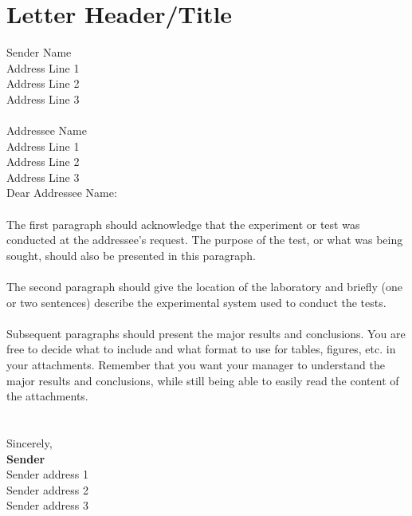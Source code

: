 \documentclass[singlespace]{Letter}
\begin{document}
\section*{Letter Header/Title}
\noindent Sender Name\\
Address Line 1\\
Address Line 2\\
Address Line 3\\

\noindent \thedate \\

\noindent Addressee Name\\
Address Line 1\\
Address Line 2\\
Address Line 3\\

\noindent Dear Addressee Name:\\
\\
\noindent The first paragraph should acknowledge that the experiment or test was conducted at the addressee’s request. The purpose of the test, or what was being sought, should also be presented in this paragraph.\\
\\
\noindent The second paragraph should give the location of the laboratory and briefly (one or two sentences) describe the experimental system used to conduct the tests.\\
\\
\noindent Subsequent paragraphs should present the major results and conclusions. You are free to decide what to include and what format to use for
tables, figures, etc. in your attachments. Remember that you want your manager to understand the major results and conclusions, while still being able to easily read the content of the attachments.\\
\\
\\
\noindent Sincerely,\\
\linebreak\linebreak\linebreak
\textbf{Sender}\\
Sender address 1\\
Sender address 2\\
Sender address 3
\end{document}
